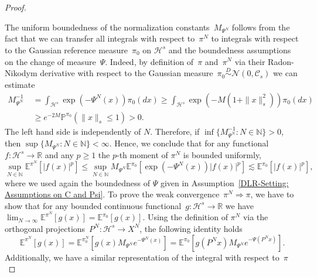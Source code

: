 \begin{proof}\autocite[Lemma 3.5, Lemma 4.3]{Mattingly2010, Pillai2012}
  
 The uniform boundedness of the normalization constants~$M_{\Psi^N}$ follows from the fact that we can transfer all integrals with respect to~$\pi^N$ to integrals with respect to the Gaussian reference measure~$\pi_0$ on $\mathcal{H}^s$ and the boundedness assumptions on the change of measure~$\Psi$. Indeed, by definition of~$\pi$ and~$\pi^N$ via their Radon-Nikodym derivative with respect to the Gaussian measure~$\pi_0 \stackrel{D}{\sim} \mathcal{N}(0, \mathcal{C}_s)$ we can estimate
 \begin{equation*}
   \begin{split}
   M_{\Psi^N}^{-1} & \; = \int_{\mathcal{H}^s} \exp (-\Psi^N(x)) \pi_0(dx) \geq \int_{\mathcal{H}^s} \exp (-M(1+ \|x\|_s^2)) \pi_0(dx) \\
   & \; \geq e^{-2M} \mathbb{P}^{\pi_0}(\|x\|_s \leq 1) > 0.
   \end{split}
 \end{equation*}
 The left hand side is independently of $N$. Therefore, if $\inf \{ M_{\Psi^N}^{-1}: N \in \mathbb{N}\} > 0$, then $ \sup\{ M_{\Psi^N}: N \in \mathbb{N}\} < \infty$. Hence, we conclude that for any functional~$f: \mathcal{H}^s \to \mathbb{R}$ and any $p\geq 1$ the $p$-th moment of $\pi^N$ is bounded uniformly,
 \begin{equation*}
  \sup_{N \in \mathbb{N}} \mathbb{E}^{\pi^N} [| f(x) |^p] \leq \sup_{N \in \mathbb{N}} M_{\Psi^N} \mathbb{E}^{\pi_0}[ \exp (-\Psi^N(x)) |f(x)|^p] \lesssim \mathbb{E}^{\pi_0}[|f(x)|^p],
 \end{equation*}
 where we used again the boundedness of $\Psi$ given in Assumption~\ref{DLR-Setting: Assumptions on C and Psi}. To prove the weak convergence~$\pi^N \Longrightarrow \pi$, we have to show that for any bounded continuous functional~$g: \mathcal{H}^s \to \mathbb{R}$ we have $\lim_{N \to \infty} \mathbb{E}^{\pi^N} [ g(x) ] = \mathbb{E}^{\pi_0}[g(x)]$. Using the definition of $\pi^N$ via the orthogonal projections~$P^N: \mathcal{H}^s \to X^N$, the following identity holds
 \begin{equation*}
   \mathbb{E}^{\pi^N} [g(x)] = \mathbb{E}^{\pi^N_0} [g(x)M_{\Psi^N} e^{-\Psi^N(x)} ] =  \mathbb{E}^{\pi_0}[ g(P^Nx) M_{\Psi^N} e^{-\Psi(P^Nx)} ].
 \end{equation*}
 Additionally, we have a similar representation of the integral with respect to~$\pi$
  \begin{equation*}

\end{equation*}
\end{proof}
